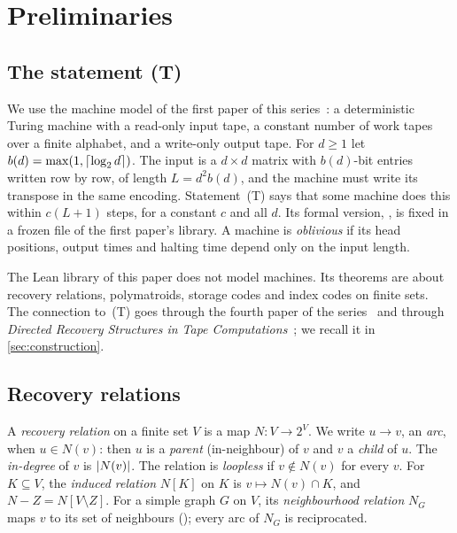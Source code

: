 \section{Preliminaries}\label{sec:prelim}

\subsection{The statement (T)}\label{sec:prelim-T}

We use the machine model of the first paper of this series~\cite{FirstPaper2026}: a deterministic Turing machine with
a read-only input tape, a constant number of work tapes over a finite alphabet, and a write-only output tape. For
$d\ge1$ let $b(d)=\max(1,\lceil \log_2 d \rceil)$. The input is a $d\times d$ matrix with $b(d)$-bit entries written row by row, of
length $L=d^2b(d)$, and the machine must write its transpose in the same encoding. Statement~(T) says that some
machine does this within $c(L+1)$ steps, for a constant $c$ and all $d$. Its formal version,
, is fixed in a frozen file of the first paper's library. A machine is
\emph{oblivious} if its head positions, output times and halting time depend only on the input length.

The Lean library of this paper does not model machines. Its theorems are about recovery relations, polymatroids,
storage codes and index codes on finite sets. The connection to~(T) goes through the fourth paper of the
series~\cite{FourthPaper2026} and through \emph{Directed Recovery Structures in Tape
Computations}~\cite{DirectedRecovery2026}; we recall it in \cref{sec:construction}.

\subsection{Recovery relations}\label{sec:prelim-relations}

A \emph{recovery relation} on a finite set $V$ is a map $N\colon V\to2^V$. We write $u\to v$, an \emph{arc}, when
$u\in N(v)$: then $u$ is a \emph{parent} (in-neighbour) of $v$ and $v$ a \emph{child} of $u$. The \emph{in-degree}
of $v$ is $\lvert N(v) \rvert$. The relation is \emph{loopless} if $v\notin N(v)$ for every $v$. For $K\subseteq V$, the
\emph{induced relation} $N[K]$ on $K$ is $v\mapsto N(v)\cap K$, and $N-Z=N[V\setminus Z]$. For a simple graph $G$ on
$V$, its \emph{neighbourhood relation} $N_G$ maps $v$ to its set of neighbours (); every
arc of $N_G$ is reciprocated.

